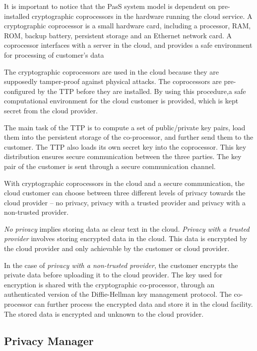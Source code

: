 \documentclass[pdftex,english,10pt,b5paper,twoside]{book}
\begin{document}
It is important to notice that the \ac{PasS} system model is dependent on
pre-installed cryptographic coprocessors in the hardware running the cloud
service. A cryptographic coprocessor is a small hardware card, including a
processor, \ac{RAM}, \ac{ROM}, backup battery, persistent storage and an
Ethernet network card. A coprocessor interfaces with a server in the cloud, and
provides a safe environment for processing of customer's data

The cryptographic coprocessors are used in the cloud because they are
supposedly tamper-proof against physical attacks. The coprocessors are
pre-configured by the \ac{TTP} before they are installed. By using this
procedure,a safe computational environment for the cloud customer is provided,
which is kept secret from the cloud provider.

The main task of the \ac{TTP} is to compute a set of public/private key pairs,
load them into the persistent storage of the co-processor, and further send
them to the customer. The \ac{TTP} also loads its own secret key into the
coprocessor. This key distribution ensures secure communication between the
three parties. The key pair of the customer is sent through a secure
communication channel.

With cryptographic coprocessors in the cloud and a secure communication, the
cloud customer can choose between three different levels of privacy towards the
cloud provider -- no privacy, privacy with a trusted provider and privacy with
a non-trusted provider.

\emph{No privacy} implies storing data as clear text in the cloud.
\emph{Privacy with a trusted provider} involves storing encrypted data in the
cloud. This data is encrypted by the cloud provider and only achievable by the
customer or cloud provider.

In the case of \emph{privacy with a non-trusted provider}, the customer
encrypts the private data before uploading it to the cloud provider. The key
used for encryption is shared with the cryptographic co-processor, through an
authenticated version of the Diffie-Hellman key management protocol. The
co-processor can further process the encrypted data and store it in the cloud
facility. The stored data is encrypted and unknown to the cloud provider.

\subsection{Privacy Manager}
\end{document}
